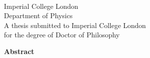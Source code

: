 \begin{titlepage}
\begin{center}

\begin{centering}
\Large \@author \\
\vspace{0.5cm}
\Large Imperial College London \\
\Large Department of Physics \\
\vspace{10cm}
\small A thesis submitted to Imperial College London \\
\small for the degree of Doctor of Philosophy
\end{centering}

\end{center}

\newpage

\begin{center}
\Large \textbf{Abstract}
\vspace{0.5cm}
\end{center}


\end{titlepage}
